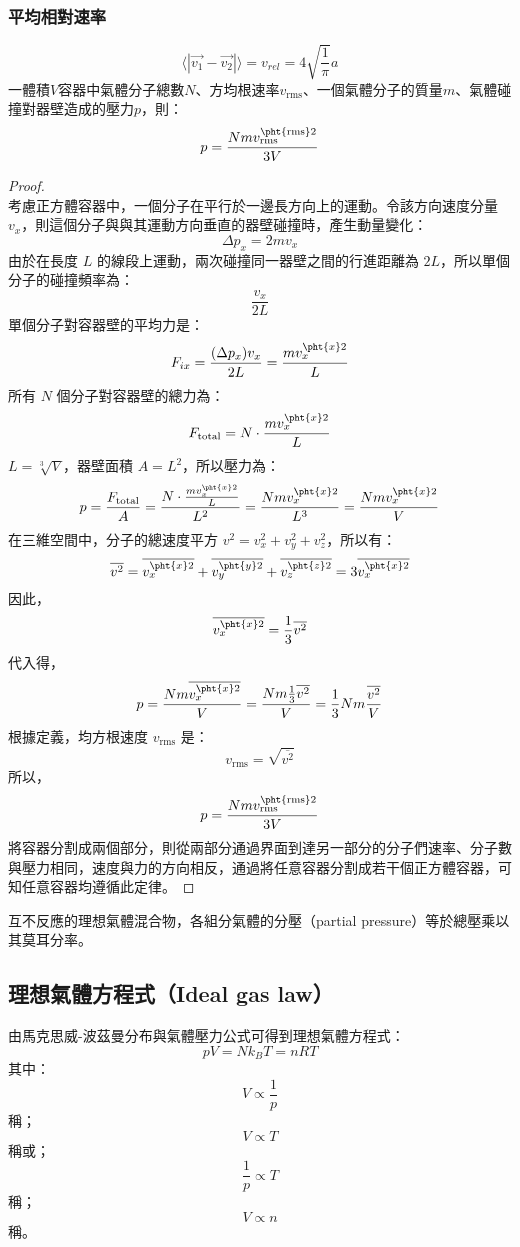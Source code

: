 \documentclass[a4paper,12pt]{report}
\begin{document}
\subsubsection{平均相對速率}
\[\langle \left|\vec{v_1} - \vec{v_2}\right| \rangle =v_{rel} = 4\sqrt{\frac{1}{\pi}}a\]
一體積$V$容器中氣體分子總數$N$、方均根速率$v_{\text{rms}}$、一個氣體分子的質量$m$、氣體碰撞對器壁造成的壓力$p$，則：
\[p=\frac{Nmv_{\text{rms}}^{\pht{\text{rms}}2}}{3V}\]
\begin{proof}\mbox{}\\
考慮正方體容器中，一個分子在平行於一邊長方向上的運動。令該方向速度分量 \( v_x \)，則這個分子與與其運動方向垂直的器壁碰撞時，產生動量變化：
\[ \Delta p_x = 2mv_x \]
由於在長度 \( L \) 的線段上運動，兩次碰撞同一器壁之間的行進距離為 \( 2L \)，所以單個分子的碰撞頻率為：
\[ \frac{v_x}{2L} \]
單個分子對容器壁的平均力是：
\[ F_{ix} = \frac{(\Delta p_x) v_x}{2L} = \frac{mv_x^{\pht{x}2}}{L} \]
所有 \( N \) 個分子對容器壁的總力為：
\[ F_{\text{total}} = N \cdot \frac{mv_x^{\pht{x}2}}{L} \]
\( L = \sqrt[3]{V} \)，器壁面積 \( A = L^2 \)，所以壓力為：
\[ p = \frac{F_{\text{total}}}{A} = \frac{N \cdot \frac{mv_x^{\pht{x}2}}{L}}{L^2} = \frac{N m v_x^{\pht{x}2}}{L^3} = \frac{N m v_x^{\pht{x}2}}{V} \]
在三維空間中，分子的總速度平方 \( v^2 = v_x^2 + v_y^2 + v_z^2 \)，所以有：
\[ \overline{v^2} = \overline{v_x^{\pht{x}2}} + \overline{v_y^{\pht{y}2}} + \overline{v_z^{\pht{z}2}} = 3 \overline{v_x^{\pht{x}2}} \]
因此，
\[ \overline{v_x^{\pht{x}2}} = \frac{1}{3} \overline{v^2} \]
代入得，
\[ p = \frac{N m \overline{v_x^{\pht{x}2}}}{V} = \frac{N m \frac{1}{3} \overline{v^2}}{V} = \frac{1}{3} N m \frac{\overline{v^2}}{V} \]
根據定義，均方根速度 \( v_{\text{rms}} \) 是：
\[ v_{\text{rms}} = \sqrt{\overline{v^2}} \]
所以，
\[ p = \frac{Nmv_{\text{rms}}^{\pht{\text{rms}}2}}{3V} \]
將容器分割成兩個部分，則從兩部分通過界面到達另一部分的分子們速率、分子數與壓力相同，速度與力的方向相反，通過將任意容器分割成若干個正方體容器，可知任意容器均遵循此定律。
\end{proof}
互不反應的理想氣體混合物，各組分氣體的分壓（partial pressure）等於總壓乘以其莫耳分率。
\subsection{理想氣體方程式（Ideal gas law）}
由馬克思威-波茲曼分布與氣體壓力公式可得到理想氣體方程式：
\[pV = Nk_BT = nRT \]
其中：
\[V\propto\frac{1}{p}\]
稱；
\[V\propto T\]
稱或；
\[\frac{1}{p}\propto T\]
稱；
\[V\propto n\]
稱。
\end{document}
